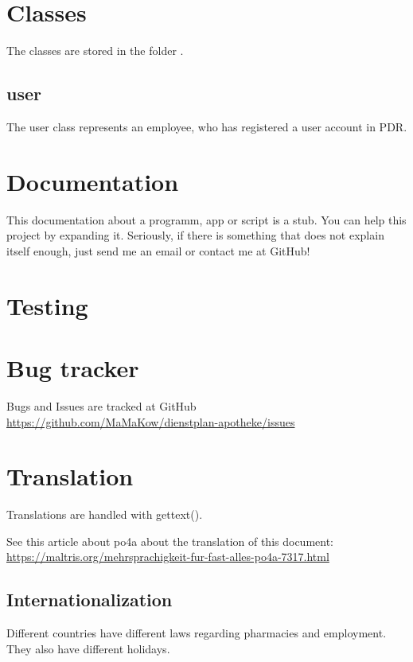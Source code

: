 \section{Classes}
The classes are stored in the folder . 

\subsection{user}
The user class represents an employee, who has registered a user account in PDR.


\section{Documentation}
This documentation about a programm, app or script is a stub. You can help this project by expanding it.
Seriously, if there is something that does not explain itself enough, just send me an email or contact me at GitHub!


\section{Testing}


\section{Bug tracker}
Bugs and Issues are tracked at GitHub \url{https://github.com/MaMaKow/dienstplan-apotheke/issues}


\section{Translation}
Translations are handled with gettext().

See this article about po4a about the translation of this document:
\url{https://maltris.org/mehrsprachigkeit-fur-fast-alles-po4a-7317.html}

\subsection{Internationalization}
Different countries have different laws regarding pharmacies and employment. They also have different holidays.
